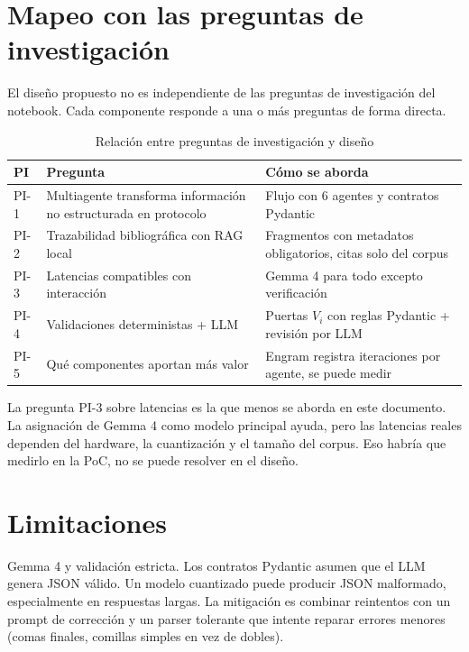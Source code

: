 \documentclass[12pt, a4paper]{article}
\begin{document}
\section{Mapeo con las preguntas de investigación}

El diseño propuesto no es independiente de las preguntas de investigación
del notebook. Cada componente responde a una o más preguntas de forma
directa.

\begin{table}[h!]
\centering
\begin{tabular}{@{}p{1.5cm}p{5cm}p{5.5cm}@{}}
\toprule
\textbf{PI} & \textbf{Pregunta} & \textbf{Cómo se aborda} \\
\midrule
PI-1 & Multiagente transforma información no estructurada en protocolo & Flujo con 6 agentes y contratos Pydantic \\
\addlinespace
PI-2 & Trazabilidad bibliográfica con RAG local & Fragmentos con metadatos obligatorios, citas solo del corpus \\
\addlinespace
PI-3 & Latencias compatibles con interacción & Gemma 4 para todo excepto verificación \\
\addlinespace
PI-4 & Validaciones deterministas + LLM & Puertas $V_i$ con reglas Pydantic + revisión por LLM \\
\addlinespace
PI-5 & Qué componentes aportan más valor & Engram registra iteraciones por agente, se puede medir \\
\bottomrule
\end{tabular}
\caption{Relación entre preguntas de investigación y diseño}
\end{table}

La pregunta PI-3 sobre latencias es la que menos se aborda en este
documento. La asignación de Gemma 4 como modelo principal ayuda, pero
las latencias reales dependen del hardware, la cuantización y el tamaño
del corpus. Eso habría que medirlo en la PoC, no se puede resolver en
el diseño.

\section{Limitaciones}

Gemma 4 y validación estricta. Los contratos Pydantic asumen que el LLM
genera JSON válido. Un modelo cuantizado puede producir JSON malformado,
especialmente en respuestas largas. La mitigación es combinar reintentos
con un prompt de corrección y un parser tolerante que intente reparar
errores menores (comas finales, comillas simples en vez de dobles).
\end{document}
